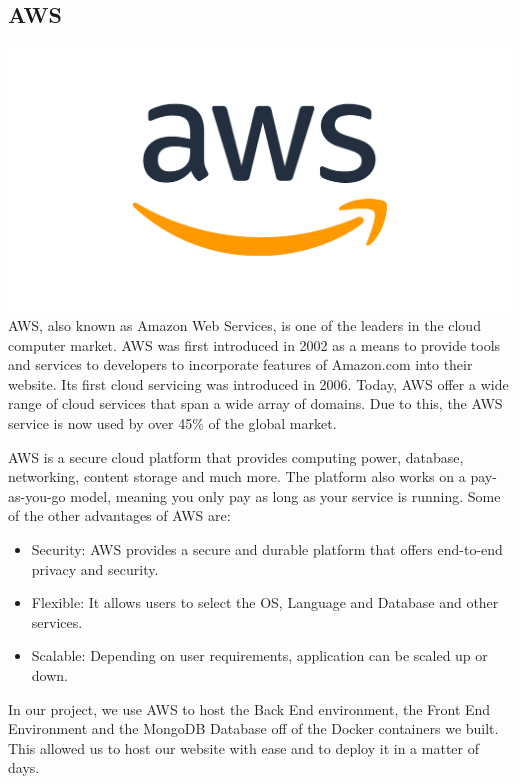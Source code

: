 \subsection{AWS}
\includegraphics[scale = 0.4]{img/aws_logo_smile_1200x630.png}\newline
AWS, also known as Amazon Web Services, is one of the leaders in the cloud computer market. AWS was first introduced in 2002 as a means to provide tools and services to developers to incorporate features of Amazon.com into their website. Its first cloud servicing was introduced in 2006. Today, AWS offer a wide range of cloud services that span a wide array of domains. Due to this, the AWS service is now used by over 45\% of the global market. \par
AWS is a secure cloud platform that provides computing power, database, networking, content storage and much more. The platform also works on a pay-as-you-go model, meaning you only pay as long as your service is running. Some of the other advantages of AWS are:
\begin{itemize}
    \item Security: AWS provides a secure and durable platform that offers end-to-end privacy and security.
    \item Flexible: It allows users to select the OS, Language and Database and other services.
    \item Scalable: Depending on user requirements, application can be scaled up or down.
\end{itemize}
In our project, we use AWS to host the Back End environment, the Front End Environment and the MongoDB Database off of the Docker containers we built. This allowed us to host our website with ease and to deploy it in a matter of days.

